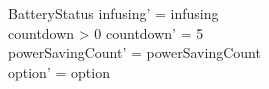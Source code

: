 \begin{schema}{BatteryStatus}
	infusing' = infusing\\
	countdown > 0 \land countdown' = 5\\
	powerSavingCount' = powerSavingCount\\ option' = option\\
\end{schema}

